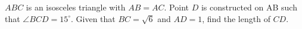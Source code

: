 $ABC$ is an isosceles triangle with $AB=AC$. Point $D$ is constructed on AB such that $\angle{BCD}=15^\circ$. Given that $BC=\sqrt{6}$ and $AD=1$, find the length of $CD$.